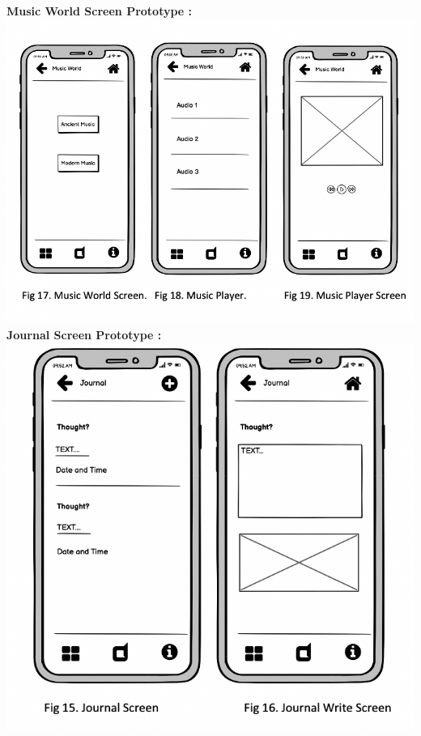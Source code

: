 \newline
\textbf{Music World Screen Prototype :} 
\newline
\includegraphics[scale=0.8]{musicwireframe.png}
\newpage
\textbf{Journal Screen Prototype :} 
\newline
\includegraphics[scale=0.8]{journalwireframe.png}

